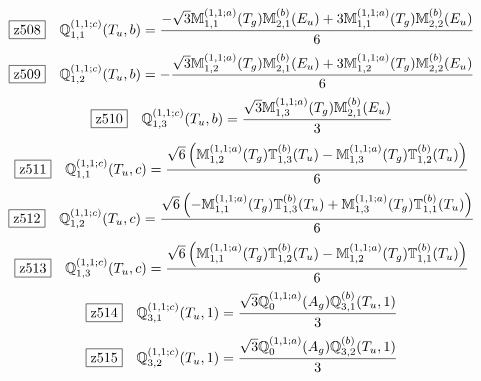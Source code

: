 \documentclass[fleqn,10pt,landscape]{jsarticle}
\begin{document}
\begin{dmath*}
\hspace*{3mm}\fbox{z508}\quad \mathbb{Q}_{1,1}^{(1,1;c)}(T_{u},b)=\frac{- \sqrt{3} \mathbb{M}_{1,1}^{(1,1;a)}(T_{g}) \mathbb{M}_{2,1}^{(b)}(E_{u}) + 3 \mathbb{M}_{1,1}^{(1,1;a)}(T_{g}) \mathbb{M}_{2,2}^{(b)}(E_{u})}{6}
\end{dmath*}
\begin{dmath*}
\hspace*{3mm}\fbox{z509}\quad \mathbb{Q}_{1,2}^{(1,1;c)}(T_{u},b)=- \frac{\sqrt{3} \mathbb{M}_{1,2}^{(1,1;a)}(T_{g}) \mathbb{M}_{2,1}^{(b)}(E_{u}) + 3 \mathbb{M}_{1,2}^{(1,1;a)}(T_{g}) \mathbb{M}_{2,2}^{(b)}(E_{u})}{6}
\end{dmath*}
\begin{dmath*}
\hspace*{3mm}\fbox{z510}\quad \mathbb{Q}_{1,3}^{(1,1;c)}(T_{u},b)=\frac{\sqrt{3} \mathbb{M}_{1,3}^{(1,1;a)}(T_{g}) \mathbb{M}_{2,1}^{(b)}(E_{u})}{3}
\end{dmath*}
\begin{dmath*}
\hspace*{3mm}\fbox{z511}\quad \mathbb{Q}_{1,1}^{(1,1;c)}(T_{u},c)=\frac{\sqrt{6} \left(\mathbb{M}_{1,2}^{(1,1;a)}(T_{g}) \mathbb{T}_{1,3}^{(b)}(T_{u}) - \mathbb{M}_{1,3}^{(1,1;a)}(T_{g}) \mathbb{T}_{1,2}^{(b)}(T_{u})\right)}{6}
\end{dmath*}
\begin{dmath*}
\hspace*{3mm}\fbox{z512}\quad \mathbb{Q}_{1,2}^{(1,1;c)}(T_{u},c)=\frac{\sqrt{6} \left(- \mathbb{M}_{1,1}^{(1,1;a)}(T_{g}) \mathbb{T}_{1,3}^{(b)}(T_{u}) + \mathbb{M}_{1,3}^{(1,1;a)}(T_{g}) \mathbb{T}_{1,1}^{(b)}(T_{u})\right)}{6}
\end{dmath*}
\begin{dmath*}
\hspace*{3mm}\fbox{z513}\quad \mathbb{Q}_{1,3}^{(1,1;c)}(T_{u},c)=\frac{\sqrt{6} \left(\mathbb{M}_{1,1}^{(1,1;a)}(T_{g}) \mathbb{T}_{1,2}^{(b)}(T_{u}) - \mathbb{M}_{1,2}^{(1,1;a)}(T_{g}) \mathbb{T}_{1,1}^{(b)}(T_{u})\right)}{6}
\end{dmath*}
\begin{dmath*}
\hspace*{3mm}\fbox{z514}\quad \mathbb{Q}_{3,1}^{(1,1;c)}(T_{u},1)=\frac{\sqrt{3} \mathbb{Q}_{0}^{(1,1;a)}(A_{g}) \mathbb{Q}_{3,1}^{(b)}(T_{u},1)}{3}
\end{dmath*}
\begin{dmath*}
\hspace*{3mm}\fbox{z515}\quad \mathbb{Q}_{3,2}^{(1,1;c)}(T_{u},1)=\frac{\sqrt{3} \mathbb{Q}_{0}^{(1,1;a)}(A_{g}) \mathbb{Q}_{3,2}^{(b)}(T_{u},1)}{3}
\end{dmath*}
\end{document}
